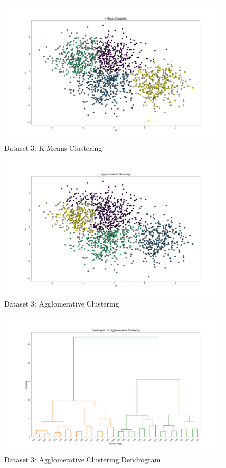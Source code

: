 \begin{figure}[H]
	\centering
	\includegraphics[width=0.9\linewidth]{Images/Clusters-5-v2-K-Means Clustering.png}
	\caption{Dataset 3: K-Means Clustering}
	\label{fig:clusters-5-v2-k-means-clustering}
\end{figure}

\begin{figure}[H]
	\centering
	\includegraphics[width=0.9\linewidth]{Images/Clusters-5-v2-Agglomerative Clustering.png}
	\caption{Dataset 3: Agglomerative Clustering}
	\label{fig:clusters-5-v2-agglomerative-clustering}
\end{figure}

\begin{figure}[H]
    \centering
    \includegraphics[width=0.75\linewidth]{Images/Clusters-5-v2-Agglomerative-Dendrogram.png}
    \caption{Dataset 3: Agglomerative Clustering Dendrogram}
    \label{fig:clusters-5-v2-agglomerative-dendrogram}
\end{figure}

